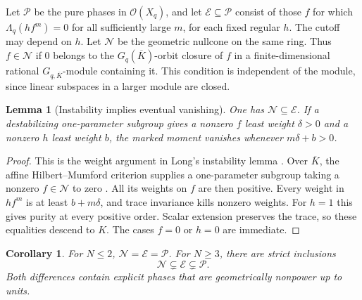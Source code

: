 \documentclass[11pt]{article}
\newtheorem{lemma}[theorem]{Lemma}
\newtheorem{corollary}[theorem]{Corollary}
\newcommand{\Lq}{\Lambda_q}
\begin{document}
Let \(\mathcal P\) be the pure phases in \(\mathcal O(X_q)\), and let
\(\mathcal E\subseteq\mathcal P\) consist of those \(f\) for which
\(\Lq(h f^m)=0\) for all sufficiently large \(m\), for each fixed
regular \(h\). The cutoff may depend on \(h\).
Let \(\mathcal N\) be the geometric nullcone on the same ring.
Thus \(f\in\mathcal N\) if \(0\) belongs to the
\(G_q(\overline K)\)-orbit closure of \(f\) in a finite-dimensional
rational \(G_{q,\overline K}\)-module containing it. This condition
is independent of the module, since linear subspaces in a larger
module are closed.

\begin{lemma}[Instability implies eventual vanishing]\label{lem:unstable}
One has \(\mathcal N\subseteq\mathcal E\). If a destabilizing
one-parameter subgroup gives a nonzero \(f\) least weight
\(\delta>0\) and a nonzero \(h\) least weight \(b\), the marked
moment vanishes whenever \(m\delta+b>0\).
\end{lemma}

\begin{proof}
This is the weight argument in Long's instability lemma
\cite[Lem.~2.1]{Long}. Over \(\overline K\), the affine
Hilbert--Mumford criterion supplies a one-parameter subgroup taking
a nonzero \(f\in\mathcal N\) to zero \cite[p.~1]{Kempf}.
All its weights on \(f\) are then positive. Every weight in \(h f^m\)
is at least \(b+m\delta\), and trace invariance kills nonzero weights.
For \(h=1\) this gives purity at every positive order. Scalar extension
preserves the trace, so these equalities descend to \(K\).
The cases \(f=0\) or \(h=0\) are immediate.
\end{proof}

\begin{corollary}\label{cor:nullcone}
For \(N\le2\), \(\mathcal N=\mathcal E=\mathcal P\).
For \(N\ge3\), there are strict inclusions
\[
             \mathcal N\subsetneq\mathcal E\subsetneq\mathcal P.
\]
Both differences contain explicit phases that are geometrically nonpower
up to units.
\end{corollary}
\end{document}
